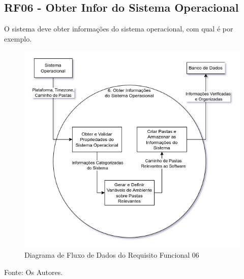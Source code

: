 \documentclass[a4paper,12pt]{article}
\begin{document}
\pagebreak
\subsection{RF06 - Obter Infor do Sistema Operacional}
O sistema deve obter informações do sistema operacional, com qual é por exemplo.
\begin{figure}[H]
	\centering
	\includegraphics[scale=0.45]{DFDs/RF06.drawio.png}
	\caption{Diagrama de Fluxo de Dados do Requisito Funcional 06}
\end{figure}
\noindent Fonte: Os Autores.

\pagebreak
\end{document}
